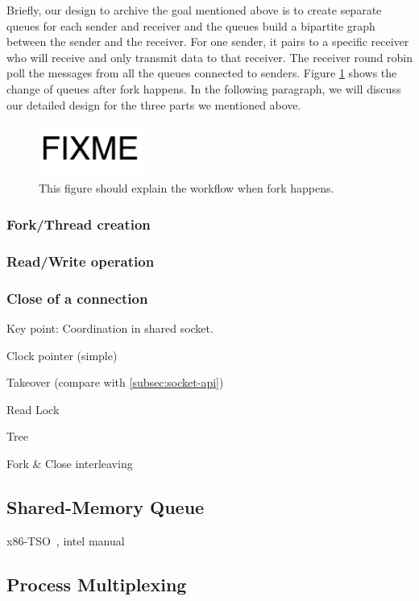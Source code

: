 Briefly, our design to archive the goal mentioned above is to create separate queues for each sender and receiver and the queues build a bipartite graph between the sender and the receiver. For one sender, it pairs to a specific receiver who will receive and only transmit data to that receiver. The receiver round robin poll the messages from all the queues connected to senders. Figure \ref{fig:fork-process} shows the change of queues after fork happens. In the following paragraph, we will discuss our detailed design for the three parts we mentioned above.


\begin{figure}[t]
	\centering
	\includegraphics[width=0.3\textwidth]{images/fixme}
	\caption{This figure should explain the workflow when fork happens.}
	\label{fig:fork-process}
\end{figure}

\subsubsection{Fork/Thread creation}

\subsubsection{Read/Write operation}
\subsubsection{Close of a connection}
  
Key point: Coordination in shared socket.

Clock pointer (simple)

Takeover (compare with \ref{subsec:socket-api})

Read Lock

Tree

Fork \& Close interleaving

\subsection{Shared-Memory Queue}

x86-TSO~\cite{sewell2010x86}, intel manual~\cite{intel-manual}

\subsection{Process Multiplexing}
\label{subsec:epoll}



